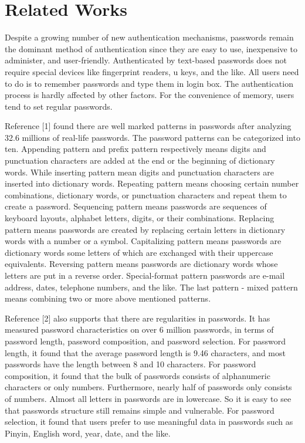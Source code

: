 \section{Related Works}
Despite a growing number of new authentication mechanisms, passwords remain the dominant method of authentication since they are easy to use, inexpensive to administer, and user-friendly. Authenticated by text-based passwords does not require special devices like fingerprint readers, u keys, and the like. All users need to do is to remember passwords and type them in login box. The authentication process is hardly affected by other factors. For the convenience of memory, users tend to set regular passwords. 

Reference [1] found there are well marked patterns in passwords after analyzing 32.6 millions of real-life passwords. The password patterns can be categorized into ten. Appending pattern and prefix pattern respectively means digits and punctuation characters are added at the end or the beginning of dictionary words. While inserting pattern mean digits and punctuation characters are inserted into dictionary words. Repeating pattern means choosing certain number combinations, dictionary words, or punctuation characters and repeat them to create a password. Sequencing pattern means passwords are sequences of keyboard layouts, alphabet letters, digits, or their combinations. Replacing pattern means passwords are created by replacing certain letters in dictionary words with a number or a symbol. Capitalizing pattern means passwords are dictionary words some letters of which are exchanged with their uppercase equivalents. Reversing pattern means passwords are dictionary words whose letters are put in a reverse order. Special-format pattern passwords are e-mail address, dates, telephone numbers, and the like. The last pattern - mixed pattern means combining two or more above mentioned patterns. 

Reference [2] also supports that there are regularities in passwords. It has measured password characteristics on over 6 million passwords, in terms of password length, password composition, and password selection. For password length, it found that the average password length is 9.46 characters, and most passwords have the length between 8 and 10 characters. For password composition, it found that the bulk of passwords consists of alphanumeric characters or only numbers. Furthermore, nearly half of passwords only consists of numbers. Almost all letters in passwords are in lowercase. So it is easy to see that passwords structure still remains simple and vulnerable. For password selection, it found that users prefer to use meaningful data in passwords such as Pinyin, English word, year, date, and the like. 

